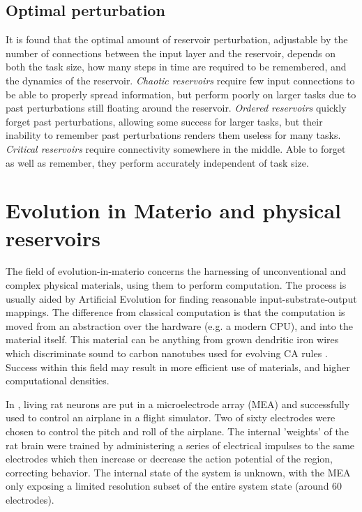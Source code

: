 \subsection{Optimal perturbation}
\label{section:optimal-perturbance}
It is found that the optimal amount of reservoir perturbation,
adjustable by the number of connections between the input layer and the reservoir,
depends on both the task size, how many steps in time are required to be remembered,
and the dynamics of the reservoir.
\textit{Chaotic reservoirs} require few input connections to be able to properly spread information,
but perform poorly on larger tasks due to past perturbations still floating around the reservoir.
\textit{Ordered reservoirs} quickly forget past perturbations, allowing some success for larger tasks,
but their inability to remember past perturbations renders them useless for many tasks.
\textit{Critical reservoirs} require connectivity somewhere in the middle.
Able to forget as well as remember, they perform accurately independent of task size.


\section{Evolution in Materio and physical reservoirs}
\label{section:evo-materio-physical-reservoirs}

The field of evolution-in-materio \cite{miller2002evolution} concerns the harnessing of unconventional and complex physical materials,
using them to perform computation.
The process is usually aided by Artificial Evolution for finding reasonable input-substrate-output mappings.
The difference from classical computation is that the computation is moved from an abstraction over the hardware (e.g. a modern CPU), and into the material itself.
This material can be anything from grown dendritic iron wires which discriminate sound \cite{pask1958physical} to carbon nanotubes used for evolving CA rules \cite{farstad2015evolving}.
Success within this field may result in more efficient use of materials,
and higher computational densities.

In \cite{demarse2005adaptive},
living rat neurons are put in a microelectrode array (MEA) and successfully used to control an airplane in a flight simulator.
Two of sixty electrodes were chosen to control the pitch and roll of the airplane.
The internal 'weights' of the rat brain were trained by administering a series of electrical impulses to the same electrodes which then increase or decrease the action potential of the region,
correcting behavior.
The internal state of the system is unknown,
with the MEA only exposing a limited resolution subset of the entire system state
(around 60 electrodes).

